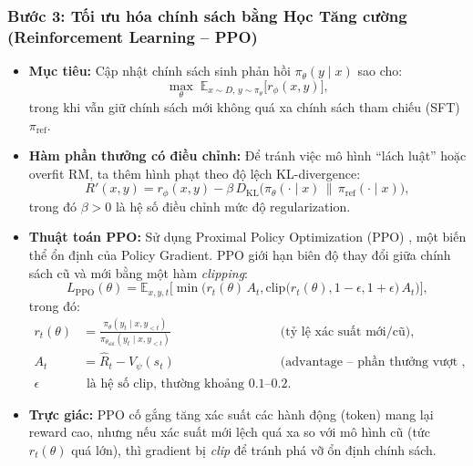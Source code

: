 \subsubsection*{Bước 3: Tối ưu hóa chính sách bằng Học Tăng cường (Reinforcement Learning – PPO)}

\begin{itemize}
    \item \textbf{Mục tiêu:}  
    Cập nhật chính sách sinh phản hồi \( \pi_{\theta}(y \mid x) \) sao cho:
    \[
        \max_{\theta} \;
        \mathbb{E}_{x \sim D, \, y \sim \pi_{\theta}} \big[
            r_{\phi}(x, y)
        \big],
    \]
    trong khi vẫn giữ chính sách mới không quá xa chính sách tham chiếu (SFT) \( \pi_{\text{ref}} \).

    \item \textbf{Hàm phần thưởng có điều chỉnh:}
    Để tránh việc mô hình “lách luật” hoặc overfit RM, ta thêm hình phạt theo độ lệch KL-divergence:
    \[
        R'(x, y)
        = r_{\phi}(x, y)
        - \beta \, D_{\text{KL}}\!\big(
            \pi_{\theta}(\cdot \mid x)
            \,\big\|\,
            \pi_{\text{ref}}(\cdot \mid x)
        \big),
    \]
    trong đó \( \beta > 0 \) là hệ số điều chỉnh mức độ regularization.

    \item \textbf{Thuật toán PPO:}  
    Sử dụng Proximal Policy Optimization (PPO) \cite{schulman2017proximal}, một biến thể ổn định của Policy Gradient.  
    PPO giới hạn biên độ thay đổi giữa chính sách cũ và mới bằng một hàm \emph{clipping}:
    \[
        L_{\text{PPO}}(\theta)
        = \mathbb{E}_{x, y, t}
        \Big[
            \min\Big(
                r_t(\theta) \, A_t,
                \text{clip}\big(r_t(\theta), 1 - \epsilon, 1 + \epsilon\big) \, A_t
            \Big)
        \Big],
    \]
    trong đó:
    \begin{align*}
        r_t(\theta) &= \frac{
            \pi_{\theta}(y_t \mid x, y_{<t})
        }{
            \pi_{\theta_{\text{old}}}(y_t \mid x, y_{<t})
        } \quad &\text{(tỷ lệ xác suất mới/cũ)}, \\
        A_t &= \hat{R}_t - V_{\psi}(s_t)
        \quad &\text{(advantage – phần thưởng vượt trội)}, \\
        \epsilon &\text{ là hệ số clip, thường khoảng } 0.1 \text{–} 0.2.
    \end{align*}

    \item \textbf{Trực giác:}  
    PPO cố gắng tăng xác suất các hành động (token) mang lại reward cao,  
    nhưng nếu xác suất mới lệch quá xa so với mô hình cũ (tức \( r_t(\theta) \) quá lớn), thì gradient bị \emph{clip} để tránh phá vỡ ổn định chính sách.


\end{itemize}
